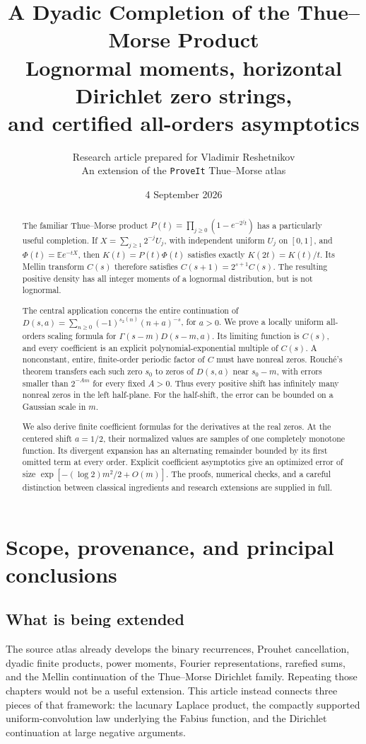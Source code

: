 \documentclass[11pt,a4paper]{article}
\title{\bfseries A Dyadic Completion of the Thue--Morse Product\\[0.4em]
\Large Lognormal moments, horizontal Dirichlet zero strings,\\
and certified all-orders asymptotics}
\author{Research article prepared for Vladimir Reshetnikov\\
\small An extension of the \texttt{ProveIt} Thue--Morse atlas}
\date{4 September 2026}
\numberwithin{equation}{section}
\theoremstyle{definition}
\theoremstyle{remark}
\newcommand{\E}{\mathbb E}
\begin{document}
\maketitle
\begin{abstract}
The familiar Thue--Morse product
$P(t)=\prod_{j\ge0}(1-e^{-2^jt})$ has a particularly useful completion.
If $X=\sum_{j\ge1}2^{-j}U_j$, with independent uniform $U_j$ on $[0,1]$,
and $\Phi(t)=\E e^{-tX}$, then $K(t)=P(t)\Phi(t)$ satisfies exactly
$K(2t)=K(t)/t$. Its Mellin transform $C(s)$ therefore satisfies
$C(s+1)=2^{s+1}C(s)$. The resulting positive density has all integer
moments of a lognormal distribution, but is not lognormal.

The central application concerns the entire continuation of
$D(s,a)=\sum_{n\ge0}(-1)^{s_2(n)}(n+a)^{-s}$, for $a>0$.
We prove a locally uniform all-orders scaling formula for
$\Gamma(s-m)D(s-m,a)$. Its limiting function is $C(s)$, and every
coefficient is an explicit polynomial-exponential multiple of $C(s)$.
A nonconstant, entire, finite-order periodic factor of $C$ must have
nonreal zeros. Rouch\'e's theorem transfers each such zero $s_0$ to
zeros of $D(s,a)$ near $s_0-m$, with errors smaller than $2^{-Am}$
for every fixed $A>0$. Thus every positive shift has infinitely many
nonreal zeros in the left half-plane. For the half-shift, the error
can be bounded on a Gaussian scale in $m$.

We also derive finite coefficient formulas for the derivatives at the
real zeros. At the centered shift $a=1/2$, their normalized values
are samples of one completely monotone function. Its divergent
expansion has an alternating remainder bounded by its first omitted
term at every order. Explicit coefficient asymptotics give an
optimized error of size $\exp[-(\log2)m^2/2+O(m)]$.
The proofs, numerical checks, and a careful distinction between
classical ingredients and research extensions are supplied in full.
\end{abstract}
\begingroup\small
\tableofcontents
\endgroup
\clearpage

\section{Scope, provenance, and principal conclusions}
\label{sec:scope}

\subsection{What is being extended}
The source atlas \cite{atlas} already develops the binary recurrences,
Prouhet cancellation, dyadic finite products, power moments, Fourier
representations, rarefied sums, and the Mellin continuation of the
Thue--Morse Dirichlet family. Repeating those chapters would not be a
useful extension. This article instead connects three pieces of that
framework: the lacunary Laplace product, the compactly supported
uniform-convolution law underlying the Fabius function, and the
Dirichlet continuation at large negative arguments.
\end{document}
